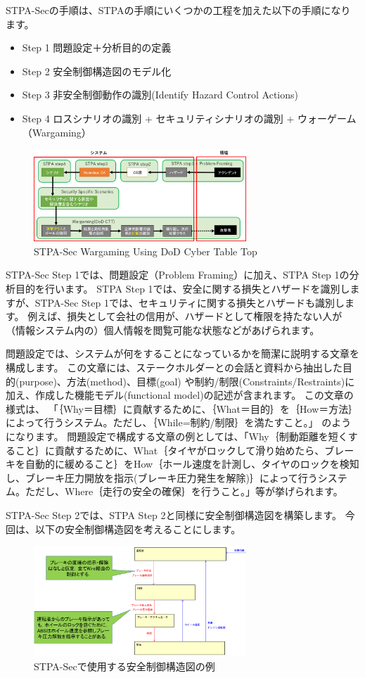 STPA-Secの手順は、STPAの手順にいくつかの工程を加えた以下の手順になります。
\begin{itemize}
    \item Step 1 問題設定＋分析目的の定義
    \item Step 2 安全制御構造図のモデル化
    \item Step 3 非安全制御動作の識別(Identify Hazard Control Actions)
    \item Step 4 ロスシナリオの識別 + セキュリティシナリオの識別 + ウォーゲーム（Wargaming）
\end{itemize}
%
\begin{figure}[H]
    \centering
    \includegraphics[width=80mm]{safety_assurance_contents/ch3images/fig-3-3-1-02.png}
    \caption[short]{STPA-Sec Wargaming Using DoD Cyber Table Top}
\end{figure}

STPA-Sec Step 1では、問題設定（Problem Framing）に加え、STPA Step 1の分析目的を行います。
STPA Step 1では、安全に関する損失とハザードを識別しますが、STPA-Sec Step 1では、セキュリティに関する損失とハザードも識別します。
例えば、損失として会社の信用が、ハザードとして権限を持たない人が（情報システム内の）個人情報を閲覧可能な状態などがあげられます。

問題設定では、システムが何をすることになっているかを簡潔に説明する文章を構成します。
この文章には、ステークホルダーとの会話と資料から抽出した目的(purpose)、方法(method)、目標(goal)
や制約/制限(Constraints/Restraints)に加え、作成した機能モデル(functional model)の記述が含まれます。
この文章の様式は、
「｛Why＝目標｝に貢献するために、｛What＝目的｝を｛How＝方法｝によって行うシステム。ただし、｛While=制約/制限｝を満たすこと。」
のようになります。
問題設定で構成する文章の例としては、「Why｛制動距離を短くすること｝に貢献するために、What｛タイヤがロックして滑り始めたら、ブレーキを自動的に緩めること｝をHow｛ホール速度を計測し、タイヤのロックを検知し、ブレーキ圧力開放を指示(ブレーキ圧力発生を解除)｝によって行うシステム。ただし、Where｛走行の安全の確保｝を行うこと。」等が挙げられます。

STPA-Sec Step 2では、STPA Step 2と同様に安全制御構造図を構築します。
今回は、以下の安全制御構造図を考えることにします。
%
\begin{figure}[H]
    \centering
    \includegraphics[width=80mm]{safety_assurance_contents/ch3images/fig-3-3-1-03.png}
    \caption[short]{STPA-Secで使用する安全制御構造図の例}
\end{figure}

